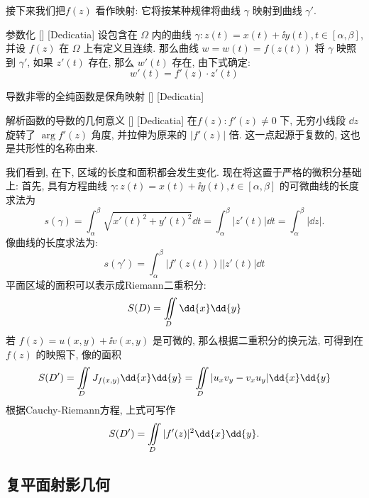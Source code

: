 \documentclass[UTF8]{ctexart}
\begin{document}
        接下来我们把  \(f(z)\) 看作映射: 它将按某种规律将曲线 \(\gamma\) 映射到曲线 \(\gamma'\). 

        \begin{thm}
            [UUID]
            {参数化}
            []
            [Dedicatia]
            设包含在 \(\Omega\) 内的曲线 \(\gamma:z(t)=x(t)+\ii y(t), t\in[\alpha,\beta]\), 并设 \(f(z)\) 在 \(\Omega\) 上有定义且连续. 那么曲线 \(w=w(t)=f(z(t))\) 将 \(\gamma\) 映照到 \(\gamma'\), 如果 \(z'(t)\) 存在, 那么 \(w'(t)\) 存在, 由下式确定: 
            \[w'(t)=f'(z)\cdot z'(t)\]
        \end{thm}

        \begin{thm}
            [UUID]
            {导数非零的全纯函数是保角映射}
            []
            [Dedicatia]

        \end{thm}

        \begin{crl}
            [UUID]
            {解析函数的导数的几何意义}
            []
            [Dedicatia]
            在\ConformalMapping  \(f(z): f'(z)\neq 0\) 下, 无穷小线段 \(\dd{z}\) 旋转了 \(\arg f'(z)\) 角度, 并拉伸为原来的 \(|f'(z)|\) 倍. 这一点起源于复数的\AngularForm, 这也是共形性的名称由来. 
        \end{crl}

        \begin{rmk}
            [Dedicatia]
            我们看到, 在\ConformalMapping 下, 区域的长度和面积都会发生变化. 现在将这置于严格的微积分基础上: 首先, 具有方程曲线 \(\gamma:z(t)=x(t)+\ii y(t), t\in[\alpha,\beta]\) 的可微曲线的长度求法为
            \[s(\gamma)=\int_\alpha^\beta\sqrt{x'(t)^2+y'(t)^2}\dd{t}=\int_{\alpha}^{\beta}|z'(t)|\dd{t}=\int_{\alpha}^\beta|\dd{z}|. \]
            像曲线的长度求法为: 
            \[s(\gamma')=\int_{\alpha}^{\beta}|f'(z(t))||z'(t)|\dd{t}\]
            平面区域的面积可以表示成Riemann二重积分: 
            \[S(D)=\iintop_D\dd{x}\dd{y}\]
            若 \(f(z)=u(x,y)+\ii v(x,y)\) 是可微的, 那么根据二重积分的换元法, 可得到在 \(f(z)\) 的映照下, 像的面积
            \[S(D')=\iintop_{D} J_{f(x,y)}\dd{x}\dd{y}=\iintop_{D}|u_xv_y-v_xu_y|\dd{x}\dd{y}\]
            根据Cauchy-Riemann方程, 上式可写作
            \[S(D')=\iintop_{D}|f'(z)|^2\dd{x}\dd{y}.\]
        \end{rmk}

    \subsection{复平面射影几何}
\end{document}
